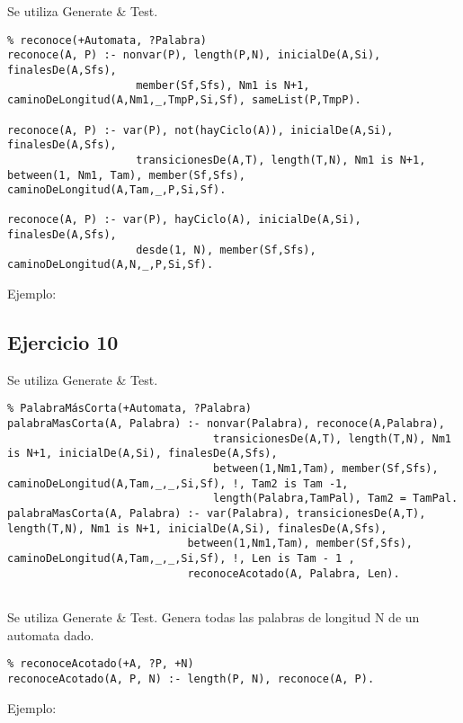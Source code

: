\documentclass[10pt, a4paper,english,spanish,hidelinks]{article}
\begin{document}
Se utiliza Generate & Test.
\begin{verbatim}
% reconoce(+Automata, ?Palabra)
reconoce(A, P) :- nonvar(P), length(P,N), inicialDe(A,Si), finalesDe(A,Sfs), 
					member(Sf,Sfs), Nm1 is N+1, caminoDeLongitud(A,Nm1,_,TmpP,Si,Sf), sameList(P,TmpP).

reconoce(A, P) :- var(P), not(hayCiclo(A)), inicialDe(A,Si), finalesDe(A,Sfs), 
					transicionesDe(A,T), length(T,N), Nm1 is N+1, between(1, Nm1, Tam), member(Sf,Sfs), caminoDeLongitud(A,Tam,_,P,Si,Sf).

reconoce(A, P) :- var(P), hayCiclo(A), inicialDe(A,Si), finalesDe(A,Sfs), 
					desde(1, N), member(Sf,Sfs), caminoDeLongitud(A,N,_,P,Si,Sf).

\end{verbatim}

Ejemplo:


\subsection{Ejercicio 10}

Se utiliza Generate & Test.

\begin{verbatim}
% PalabraMásCorta(+Automata, ?Palabra)
palabraMasCorta(A, Palabra) :- nonvar(Palabra), reconoce(A,Palabra),  
								transicionesDe(A,T), length(T,N), Nm1 is N+1, inicialDe(A,Si), finalesDe(A,Sfs), 
								between(1,Nm1,Tam), member(Sf,Sfs), caminoDeLongitud(A,Tam,_,_,Si,Sf), !, Tam2 is Tam -1,
								length(Palabra,TamPal), Tam2 = TamPal.
palabraMasCorta(A, Palabra) :- var(Palabra), transicionesDe(A,T), length(T,N), Nm1 is N+1, inicialDe(A,Si), finalesDe(A,Sfs), 
							between(1,Nm1,Tam), member(Sf,Sfs), caminoDeLongitud(A,Tam,_,_,Si,Sf), !, Len is Tam - 1 ,
							reconoceAcotado(A, Palabra, Len).


\end{verbatim}
							
Se utiliza Generate & Test.
Genera todas las palabras de longitud N de un automata dado.
\begin{verbatim}
% reconoceAcotado(+A, ?P, +N)
reconoceAcotado(A, P, N) :- length(P, N), reconoce(A, P).

\end{verbatim}

Ejemplo:
\end{document}
